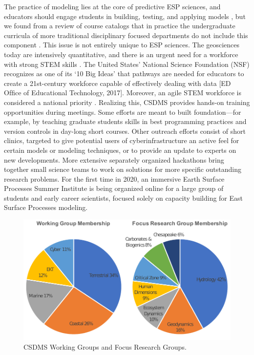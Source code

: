 \documentclass[12pt]{amsart}
\begin{document}
The practice of modeling lies at the core of predictive ESP sciences, and educators should engage students in building, testing, and applying models \citep{hestenes1996modeling,manduca2008making}, but we found from a review of course catalogs that in practice the undergraduate curricula of more traditional disciplinary focused departments do not include this component \citep{campbell2013taking}. This issue is not entirely unique to ESP sciences. The geosciences today are intensively quantitative, and there is an urgent need for a workforce with strong STEM skills \citep{national2012discipline}. The United States' National Science Foundation (NSF) recognizes as one of its `10 Big Ideas' that pathways are needed for educators to create a 21st-century workforce capable of effectively dealing with data [ED Ofﬁce of Educational Technology, 2017]. Moreover, an agile STEM workforce is considered a national priority \citep{atkins2011national}. Realizing this, CSDMS provides hands-on training opportunities during meetings. Some efforts are meant to built foundation---for example, by teaching graduate students skills in best programming practices and version controls in day-long short courses. Other outreach efforts consist of short clinics, targeted to give potential users of cyberinfrastructure an active feel for certain models or modeling techniques, or to provide an update to experts on new developments.  More extensive separately organized hackathons bring together small science teams to work on solutions for more specific outstanding research problems.  For the first time in 2020, an immersive Earth Surface Processes Summer Institute is being organized online for a large group of students and early career scientists, focused solely on capacity building for East Surface Processes modeling.

\begin{figure}[h!]
\centering
\includegraphics[scale=0.9]{Figures/working_and_focus_groups.pdf}
\caption{CSDMS Working Groups and Focus Research Groups.}
\label{fig:groups}
\end{figure}
\end{document}
